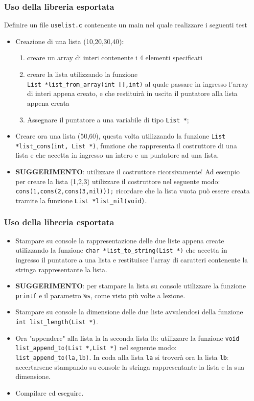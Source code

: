 \documentclass{beamer}
\begin{document}
\begin{frame}[fragile]
\frametitle{Uso della libreria esportata}
Definire un file \texttt{uselist.c} contenente un main nel quale realizzare i seguenti test
\begin{itemize}
 \item Creazione di una lista (10,20,30,40):
\begin{enumerate}
 \item creare un array di interi contenente i 4 elementi specificati
 \item creare la lista utilizzando la funzione \\ \texttt{List *list\_from\_array(int [],int)} al quale passare in ingresso l'array di interi appena creato, e che restituirà in uscita il puntatore alla lista appena creata
 \item Assegnare il puntatore a una variabile di tipo \texttt{List *};
\end{enumerate}
 \item Creare ora una lista (50,60), questa volta utilizzando la funzione \texttt{List *list\_cons(int, List *)}, funzione che rappresenta il costruttore di una lista e che accetta in ingresso un intero e un puntatore ad una lista.
 \item \textbf{SUGGERIMENTO}: utilizzare il costruttore ricorsivamente! Ad esempio per creare la lista (1,2,3) utilizzare il costruttore nel seguente modo: \texttt{cons(1,cons(2,cons(3,nil)));} ricordare che la lista vuota può essere creata tramite la funzione \texttt{List *list\_nil(void)}.
\end{itemize}
\end{frame}

\begin{frame}[fragile]
\frametitle{Uso della libreria esportata}
\begin{itemize}
 \item Stampare su console la rappresentazione delle due liste appena create utilizzando la funzione \texttt{char *list\_to\_string(List *)} che accetta in ingresso il puntatore a una lista e restituisce l'array di caratteri contenente la stringa rappresentante la lista. \item \textbf{SUGGERIMENTO}: per stampare la lista su console utilizzare la funzione \texttt{printf} e il parametro \texttt{\%s}, come visto più volte a lezione.
 \item Stampare su console la dimensione delle due liste avvalendosi della funzione \texttt{int list\_length(List *)}.
 \item Ora "appendere" alla lista la la seconda lista lb: utilizzare la funzione \texttt{void list\_append\_to(List *,List *)} nel seguente modo: \texttt{list\_append\_to(la,lb)}. In coda alla lista \texttt{la} si troverà ora la lista \texttt{lb}: accertarsene stampando su console la stringa rappresentante la lista e la sua dimensione.
 \item Compilare ed eseguire.
\end{itemize}
\end{frame}
\end{document}
